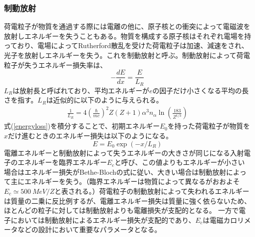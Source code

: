 \subsubsection{制動放射}
荷電粒子が物質を通過する際には電離の他に、原子核との衝突によって電磁波を放射しエネルギーを失うこともある。物質を構成する原子核はそれぞれ電場を持っており、電場によってRutherford散乱を受けた荷電粒子は加速、減速をされ、光子を放射しエネルギーを失う。これを制動放射と呼ぶ。制動放射によって荷電粒子が失うエネルギー損失率は、
\begin{equation}
	\label{energyloss}
	- { \frac{dE}{dx} } = \frac{E}{L_R}
\end{equation}
$L_R$は放射長と呼ばれており、平均エネルギーが$e$の因子だけ小さくなる平均の長さを指す。$L_R$は近似的に以下のように与えられる。
\begin{align}
\frac{1}{L_R} = 4 {\left( \frac{\hbar}{mc} \right)}^2 Z (Z+1) {\alpha}^3 n_{\alpha} \ln\left(\frac{183}{Z^{1/3}}\right)
\end{align}
式(\ref{energyloss})を積分することで、初期エネルギー$E_0$を持った荷電粒子が物質を$x$だけ進むときのエネルギー損失は以下のようになる。
\begin{equation}
E = E_0 \exp(-x/L_R)
\end{equation}
電離エネルギーと制動放射によって失うエネルギーの大きさが同じになる入射電子のエネルギーを臨界エネルギー$E_c$と呼び、この値よりもエネルギーが小さい場合はエネルギー損失がBethe-Blochの式に従い、大きい場合は制動放射によって主にエネルギーを失う。（臨界エネルギーは物質によって異なるがおおよそ$E_c \simeq \SI{500}{MeV} / Z$と表される。）荷電粒子の制動放射によって失われるエネルギーは質量の二乗に反比例するが、電離エネルギー損失は質量に強く依らないため、ほとんどの粒子に対しては制動放射よりも電離損失が支配的となる。 一方で電子においては制動放射によるエネルギー損失が支配的であり、$E_c$は電磁カロリメータなどの設計において重要なパラメータとなる。
